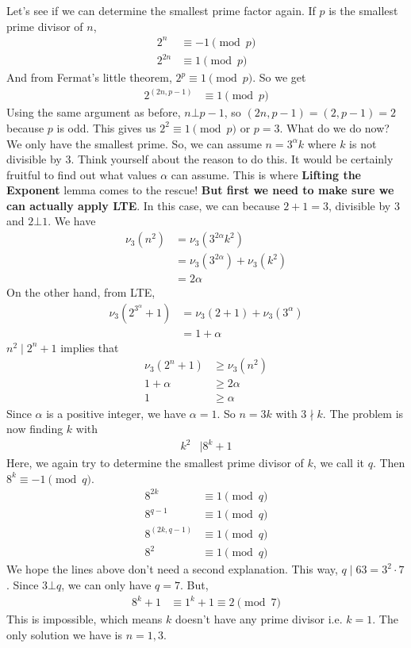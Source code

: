 \documentclass[problems.tex]{subfile}
\begin{document}
	\begin{solution}
		Let's see if we can determine the smallest prime factor again. If $p$ is the smallest prime divisor of $n$,
			\begin{align*}
				2^n &\equiv-1\pmod p\\
				2^{2n} &\equiv1\pmod p
			\end{align*}
		And from Fermat's little theorem, $2^p\equiv1\pmod p$. So we get
			\begin{align*}
				2^{(2n,p-1)} &\equiv1\pmod p
			\end{align*}
		Using the same argument as before, $n\bot p-1$, so $(2n,p-1)=(2,p-1)=2$ because $p$ is odd. This gives us $2^2\equiv1\pmod p$ or $p=3$. What do we do now? We only have the smallest prime. So, we can assume $n=3^\alpha k$ where $k$ is not divisible by $3$. Think yourself about the reason to do this. It would be certainly fruitful to find out what values $\alpha$ can assume. This is where \textbf{Lifting the Exponent} lemma comes to the rescue! \textbf{But first we need to make sure we can actually apply LTE}. In this case, we can because $2+1=3$, divisible by $3$ and $2\bot1$. We have
			\begin{align*}
				\nu_3(n^2)  & = \nu_3(3^{2\alpha }k^2)\\
							& = \nu_3(3^{2\alpha })+\nu_3(k^2)\\
							& = 2\alpha
			\end{align*}
		On the other hand, from LTE,
			\begin{align*}
				\nu_3(2^{3^\alpha}+1)  & = \nu_3(2+1)+\nu_3(3^\alpha )\\
									& = 1+\alpha
			\end{align*}
		$n^2\mid 2^n+1$ implies that
			\begin{align*}
				\nu_3(2^n+1) & \geq\nu_3(n^2)\\
				1+\alpha & \geq2\alpha\\
				1 & \geq\alpha
			\end{align*}
		Since $\alpha $ is a positive integer, we have $\alpha = 1$. So $n=3k$ with $3\nmid k$. The problem is now finding $k$ with
			\begin{align*}
				k^2 & \mid  8^k+1
			\end{align*}
		Here, we again try to determine the smallest prime divisor of $k$, we call it $q$. Then $8^k\equiv-1\pmod q$.
			\begin{align*}
				8^{2k} &\equiv1\pmod q\\
				8^{q-1}&\equiv1\pmod q\\
				8^{(2k,q-1)}&\equiv1\pmod q\\
				8^{2}&\equiv1\pmod q
			\end{align*}
		We hope the lines above don't need a second explanation. This way, $q\mid 63=3^2\cdot7$. Since $3\bot q$, we can only have $q=7$. But,
			\begin{align*}
				8^k+1 &\equiv1^k+1\equiv2\pmod7
			\end{align*}
		This is impossible, which means $k$ doesn't have any prime divisor i.e. $k=1$. The only solution we have is $n=1,3$.
	\end{solution}
\end{document}
